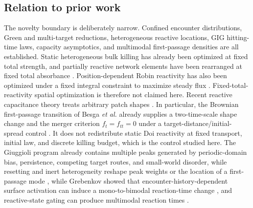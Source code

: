\documentclass[aps,pre,reprint,amsmath,amssymb,longbibliography,floatfix]{revtex4-2}
\begin{document}
\subsection{Relation to prior work}
\label{sec:novelty}

The novelty boundary is deliberately narrow. Confined encounter distributions,
Green and multi-target reductions, heterogeneous reactive locations, GIG
hitting-time laws, capacity asymptotics, and multimodal first-passage densities
are all established. Static heterogeneous bulk killing has already been
optimized at fixed total strength, and partially reactive network elements
have been rearranged at fixed total absorbance
\cite{nguyenGrebenkov2010porous,scottEtAl2021tubular}. Position-dependent
Robin reactivity has also been optimized under a fixed integral constraint to
maximize steady flux \cite{nicolaouMulder2023flux}. Fixed-total-reactivity
spatial optimization is therefore not claimed here. Recent reactive
capacitance theory treats arbitrary patch shapes
\cite{grebenkovMaurette2026capacitance}. In particular, the Brownian
first-passage transition of Besga \emph{et al.} already supplies a
two-time-scale shape change and the merger criterion \(f_t=f_{tt}=0\) under a
target-distance/initial-spread control \cite{besgaEtAl2021dynamical}. It does
not redistribute static Doi reactivity at fixed transport, initial law, and
discrete killing budget, which is the control studied here. The
Giuggioli program already contains multiple peaks generated by periodic-domain
bias, persistence, competing target routes, and small-world disorder, while
resetting and inert heterogeneity reshape peak weights or the location of a
first-passage mode
\cite{sarvaharmanGiuggioli2020biased,dasGiuggioli2022resetting,
marrisGiuggioli2024persistent,barbiniGiuggioli2024heterogeneous,
giuggioliEtAl2024multitarget,marrisEtAl2025disordered}, while Grebenkov showed
that encounter-history-dependent surface activation can induce a
mono-to-bimodal reaction-time change \cite{grebenkov2020paradigm}, and
reactive-state gating can produce multimodal reaction times
\cite{scherReuveni2021unified,scherReuveni2021discrete}.
\end{document}

